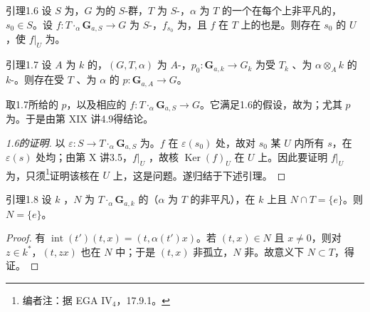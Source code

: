 \begin{SGAresult}{引理}{1.6}
设 $S$ 为，$G$ 为的 $S$-群，$T$ 为 $S$-，$\alpha$ 为 $T$ 的一个在每个上非平凡的，$s_0\in S$。设 $f:T\mathbin{\cdot}_\alpha\mathbf G_{a,S}\to G$ 为 $S$-，$f_{s_0}$ 为，且 $f$ 在 $T$ 上的也是。则存在 $s_0$ 的 $U$，使 $f|_U$ 为。
\end{SGAresult}
\begin{SGAresult}{引理}{1.7}
设 $A$ 为 $k$ 的，$(G,T,\alpha)$ 为 $A$-，$p_0:\mathbf G_{a,k}\to G_k$ 为受 $T_k$ 、为 $\alpha\otimes_Ak$ 的 $k$-。则存在受 $T$ 、为 $\alpha$ 的 $p:\mathbf G_{a,A}\to G$。
\end{SGAresult}
取1.7所给的 $p$，以及相应的 $f:T\mathbin{\cdot}_\alpha\mathbf G_{a,S}\to G$。它满足1.6的假设，故为；尤其 $p$ 为。于是由第 XIX 讲4.9得结论。
\begin{proof}[1.6的证明]
以 $\varepsilon:S\to T\mathbin{\cdot}_\alpha\mathbf G_{a,S}$ 为。$f$ 在 $\varepsilon(s_0)$ 处，故对 $s_0$ 某 $U$ 内所有 $s$，在 $\varepsilon(s)$ 处均；由第 X 讲3.5，$f|_U$ ，故核 $\operatorname{Ker}(f)_U$ 在 $U$ 上。因此要证明 $f|_U$ 为，只须\footnote{编者注：据 EGA IV$_4$，17.9.1。}证明该核在 $U$ 上，这是问题。遂归结于下述引理。
\end{proof}
\begin{SGAresult}{引理}{1.8}
设 $k$ ，$N$ 为 $T\mathbin{\cdot}_\alpha\mathbf G_{a,k}$ 的（$\alpha$ 为 $T$ 的非平凡），在 $k$ 上且 $N\cap T=\{e\}$。则 $N=\{e\}$。
\end{SGAresult}
\begin{proof}
有 $\operatorname{int}(t')(t,x)=(t,\alpha(t')x)$。若 $(t,x)\in N$ 且 $x\ne0$，则对 $z\in k^*$，$(t,zx)$ 也在 $N$ 中；于是 $(t,x)$ 非孤立，$N$ 非。故意义下 $N\subset T$，得证。
\end{proof}
